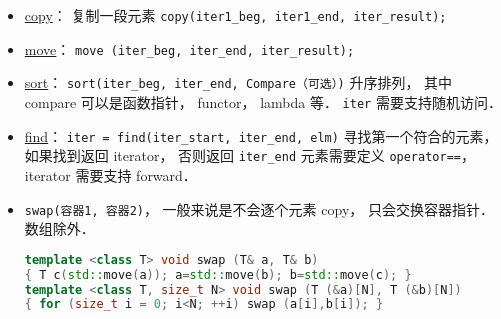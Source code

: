 
\begin{issues}
\issueDraft
\end{issues}

\begin{itemize}
\item \href{https://cplusplus.com/reference/algorithm/copy/}{copy}： 复制一段元素 \verb|copy(iter1_beg, iter1_end, iter_result);|
\item \href{https://cplusplus.com/reference/algorithm/move/}{move}： \verb|move (iter_beg, iter_end, iter_result);|
\item \href{https://cplusplus.com/reference/algorithm/sort/}{sort}： \verb|sort(iter_beg, iter_end, Compare（可选）)| 升序排列， 其中 compare 可以是函数指针， functor， lambda 等． \verb|iter| 需要支持随机访问．
\item \href{https://cplusplus.com/reference/algorithm/find/}{find}： \verb|iter = find(iter_start, iter_end, elm)| 寻找第一个符合的元素， 如果找到返回 iterator， 否则返回 \verb|iter_end| 元素需要定义 \verb|operator==|， iterator 需要支持 forward．
\item \verb|swap(容器1, 容器2)|， 一般来说是不会逐个元素 copy， 只会交换容器指针． 数组除外．
\begin{lstlisting}[language=cpp]
template <class T> void swap (T& a, T& b)
{ T c(std::move(a)); a=std::move(b); b=std::move(c); }
template <class T, size_t N> void swap (T (&a)[N], T (&b)[N])
{ for (size_t i = 0; i<N; ++i) swap (a[i],b[i]); }
\end{lstlisting}
\end{itemize}
